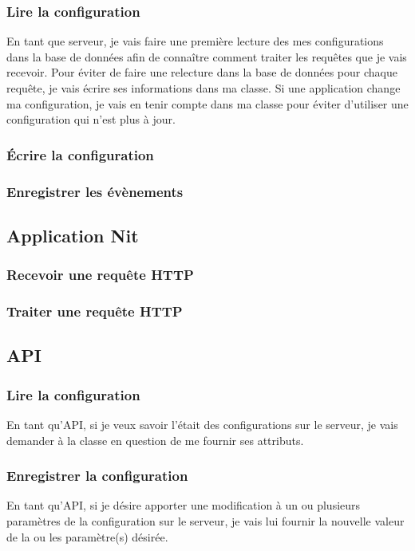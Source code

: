\documentclass{scrreprt}
\begin{document}
\subsubsection{Lire la configuration}
En tant que serveur, je vais faire une première lecture des mes configurations
dans la base de données afin de connaître comment traiter les requêtes que je 
vais recevoir.
Pour éviter de faire une relecture dans la base de données pour chaque requête,
je vais écrire ses informations dans ma classe.
Si une application change ma configuration, je vais en tenir compte dans ma
classe pour éviter d'utiliser une configuration qui n'est plus à jour.

\subsubsection{Écrire la configuration}

\subsubsection{Enregistrer les évènements}

\subsection{Application Nit}
\subsubsection{Recevoir une requête HTTP}

\subsubsection{Traiter une requête HTTP}

\subsection{API}
\subsubsection{Lire la configuration}
En tant qu'API, si je veux savoir l'était des configurations sur le serveur,
je vais demander à la classe en question de me fournir ses attributs.
\subsubsection{Enregistrer la configuration}
En tant qu'API, si je désire apporter une modification à un ou plusieurs
paramètres de la configuration sur le serveur, je vais lui fournir la nouvelle
valeur de la ou les paramètre(s) désirée.
\end{document}
